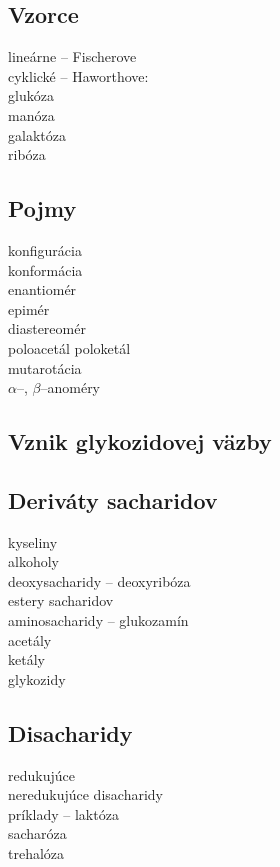 \subsection*{Vzorce}
lineárne -- Fischerove\\
\tab cyklické -- Haworthove: \\
\tab glukóza\\
\tab manóza\\
\tab galaktóza\\
\tab ribóza\\
\subsection*{Pojmy}
\tab konfigurácia\\
\tab konformácia\\
\tab enantiomér\\
\tab epimér\\
\tab diastereomér\\
\tab poloacetál
\tab poloketál\\
\tab mutarotácia\\
\tab $\alpha$--, $\beta$--anoméry\\
\subsection*{Vznik glykozidovej väzby}
\subsection*{Deriváty sacharidov}
\tab kyseliny\\
\tab alkoholy\\
\tab deoxysacharidy -- deoxyribóza\\
\tab estery sacharidov\\
\tab aminosacharidy -- glukozamín\\
\tab acetály\\
\tab ketály\\
\tab glykozidy\\
\subsection*{Disacharidy}
\tab redukujúce\\
\tab neredukujúce disacharidy\\
\tab príklady -- laktóza\\
\tab sacharóza\\
\tab trehalóza\\
